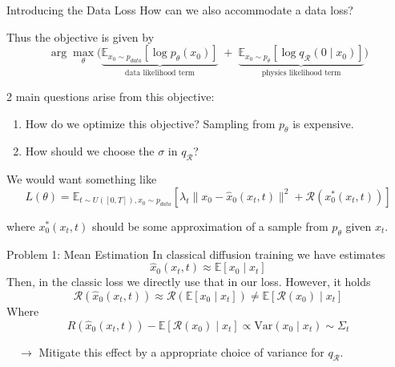 \documentclass[10pt]{beamer}
\theoremstyle{reminder}
\begin{document}
\begin{frame}{Introducing the Data Loss}
    How can we also accommodate a data loss? \\
    \pause
\begin{definition}
Thus the objective is given by
\[
\arg\max_{\theta}\Bigg(
\underbrace{
\mathbb{E}_{x_0 \sim p_{data}}\!\left[\log p_\theta(x_0)\right]
}_{\text{data likelihood term}}
\;+\;
\underbrace{
\mathbb{E}_{x_0 \sim p_\theta}\!\left[\log q_{\mathcal{R}}\!\left(0 \mid x_0\right)\right]
}_{\text{physics likelihood term}}
\Bigg)
\]
\end{definition}

\pause

2 main questions arise from this objective: \\

\begin{enumerate}
    \item How do we optimize this objective? Sampling from $p_\theta$ is expensive. 
    \item How should we choose the $\sigma$ in $q_{\mathcal{R}}$?
\end{enumerate}
\pause

We would want something like $$L(\theta) = \mathbb{E}_{t \sim U([0,T]), x_0 \sim p_{data}}\left[\lambda_t \| x_0 - \hat{x}_0(x_t, t)\|^2 + \mathcal{R}(x_0^*(x_t, t))\right]$$

where $x_0^*(x_t, t)$ should be some approximation of a sample from $p_\theta$ given $x_t$.
\end{frame}

\begin{frame}{Problem 1: Mean Estimation}
    In classical diffusion training we have estimates $$\hat{x}_0(x_t, t) \approx \mathbb{E}[x_0 \mid x_t]$$
    Then, in the classic loss we directly use that in our loss. 
    However, it holds $$\mathcal{R}(\hat{x}_0(x_t, t)) \approx \mathcal{R}(\mathbb{E}[x_0 \mid x_t]) \neq \mathbb{E}[\mathcal{R}(x_0)  \mid  x_t]$$
    Where $$R(\hat{x}_0(x_t, t)) - \mathbb{E}[\mathcal{R}(x_0)  \mid  x_t] \propto \text{Var}(x_0 \mid x_t) \sim \Sigma_t$$

    \bigbreak
    $\quad \longrightarrow$ Mitigate this effect by a appropriate choice of variance for $q_\mathcal{R}$. \\
\end{frame}
\end{document}
